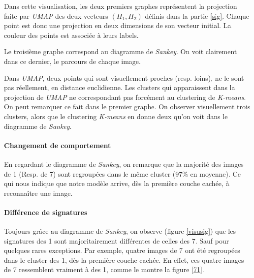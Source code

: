 \documentclass[oneside,13pt,a4paper]{report}
\begin{document}
Dans cette visualisation, les deux premiers graphes représentent la projection faite par \textit{UMAP} des deux vecteurs $ (H_1, H_2) $ définis dans la partie \ref{sig}. Chaque point est donc une projection en deux dimensions de son vecteur initial. La couleur des points est associée à leurs labels.

Le troisième graphe correspond au diagramme de \textit{Sankey}. On voit clairement dans ce dernier, le parcours de chaque image.

Dans \textit{UMAP}, deux points qui sont visuellement proches (resp. loins), ne le sont pas réellement, en distance euclidienne. Les clusters qui apparaissent dans la projection de \textit{UMAP} ne correspondant pas forcément au clustering de \textit{K-means}. On peut remarquer ce fait dans le premier graphe. On observer visuellement trois clusters, alors que le clustering \textit{K-means} en donne deux qu'on voit dans le diagramme de \textit{Sankey}.

\paragraph{Changement de comportement}

En regardant le diagramme de \textit{Sankey}, on remarque que la majorité des images de 1 (Resp. de 7) sont regroupées dans le même cluster (97\% en moyenne). Ce qui nous indique que notre modèle arrive, dès la première couche cachée, à reconnaître une image.

\paragraph{Différence de signatures}

Toujours grâce au diagramme de \textit{Sankey}, on observe (figure \ref{visusig}) que les signatures des 1 sont majoritairement différentes de celles des 7. Sauf pour quelques rares exceptions. Par exemple, quatre images de 7 ont été regroupées dans le cluster des 1, dès la première couche cachée. En effet, ces quatre images de 7 ressemblent vraiment à des 1, comme le montre la figure \ref{71}.
\end{document}
